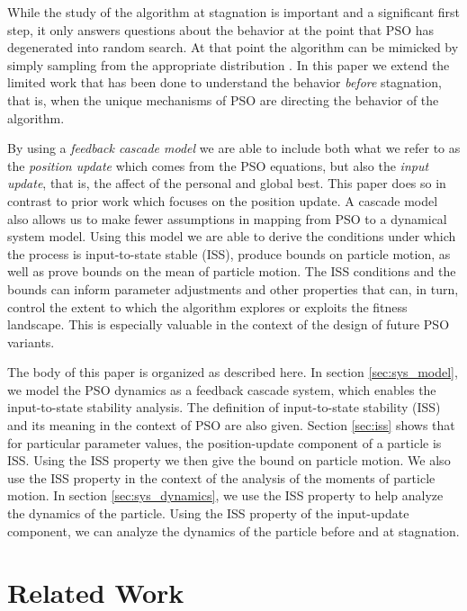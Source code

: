 \documentclass{sig-alternate}
\begin{document}
While the study of the algorithm at stagnation is important and a significant first step, it only answers questions about the behavior at the point that PSO has degenerated into random search.
At that point the algorithm can be mimicked by simply sampling from the appropriate distribution \cite{5175367}.
In this paper we extend the limited work that has been done to understand
the behavior \emph{before} stagnation, that is, when the unique mechanisms of PSO are directing the behavior of the algorithm.

By using a \emph{feedback cascade model} we are able to include both what we refer to as the \emph{position update} which comes from the PSO equations, but also the \emph{input update}, that is, the affect of the personal and global best.
This paper does so in contrast to prior work which focuses on the position update.
A cascade model also allows us to make fewer assumptions in mapping from PSO to a dynamical system model.
Using this model we are able to derive the conditions under which the process is input-to-state stable (ISS)\cite{Jiang2001857}, produce bounds on particle motion, as well as prove bounds on the mean of particle motion.
The ISS conditions and the bounds can inform parameter adjustments and other properties that can, in turn, control the extent to which the algorithm explores or exploits the fitness landscape.
This is especially valuable in the context of the design of future PSO variants. 

The body of this paper is organized as described here.
In section \ref{sec:sys_model}, we model the PSO dynamics as a feedback cascade system, which enables the input-to-state stability analysis.
The definition of input-to-state stability (ISS) and its meaning in the context of PSO are also given.
Section \ref{sec:iss} shows that for particular parameter values, the position-update component of a particle is ISS. 
Using the ISS property we then give the bound on particle motion.
We also use the ISS property in the context of the analysis of the moments of particle motion.
In section \ref{sec:sys_dynamics}, we use the ISS property to help analyze the dynamics of the particle.
Using the ISS property of the input-update component, we can analyze the dynamics of the particle before and at stagnation.

\section{Related Work}
\label{sec:relwork}
\end{document}
